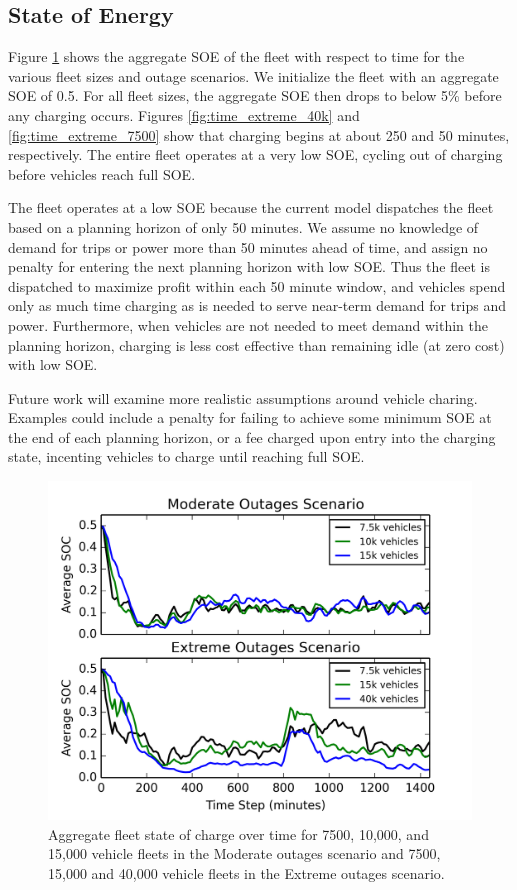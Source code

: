 \documentclass[journal]{IEEEtran}
\begin{document}
\subsection{State of Energy}
Figure \ref{fig:soe} shows the aggregate SOE of the fleet with respect to time for the various fleet sizes and outage scenarios. We initialize the fleet with an aggregate SOE of 0.5. For all fleet sizes, the aggregate SOE then drops to below 5\% before any charging occurs. Figures \ref{fig:time_extreme_40k} and \ref{fig:time_extreme_7500} show that charging begins at about 250 and 50 minutes, respectively. The entire fleet operates at a very low SOE, cycling out of charging before vehicles reach full SOE. 

The fleet operates at a low SOE because the current model dispatches the fleet based on a planning horizon of only 50 minutes. We assume no knowledge of demand for trips or power more than 50 minutes ahead of time, and assign no penalty for entering the next planning horizon with low SOE. Thus the fleet is dispatched to maximize profit within each 50 minute window, and vehicles spend only as much time charging as is needed to serve near-term demand for trips and power. Furthermore, when vehicles are not needed to meet demand within the planning horizon, charging is less cost effective than remaining idle (at zero cost) with low SOE.

Future work will examine more realistic assumptions around vehicle charing. Examples could include a penalty for failing to achieve some minimum SOE at the end of each planning horizon, or a fee charged upon entry into the charging state, incenting vehicles to charge until reaching full SOE.

\begin{figure}[!htbp]
  \includegraphics[width=\linewidth]{plots/soc_v_time.png}
  \caption{Aggregate fleet state of charge over time for 7500, 10,000, and 15,000 vehicle fleets in the Moderate outages scenario and 7500, 15,000 and 40,000 vehicle fleets in the Extreme outages scenario.}
  \label{fig:soe}
\end{figure}
\end{document}
